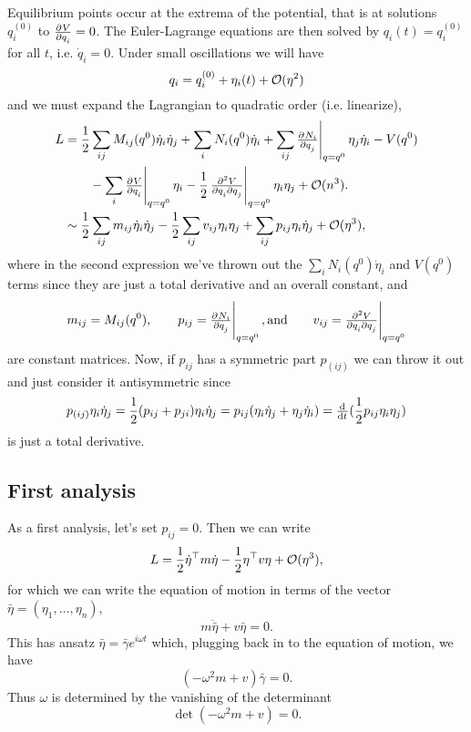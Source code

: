 Equilibrium points occur at the extrema of the potential, that is at solutions $q_i^{(0)}$ to $\pd{V}{q_i} = 0$. The Euler-Lagrange equations are then solved by $q_i(t) = q_i^{(0)}$ for all $t$, i.e. $\dot{q}_i = 0$. Under small oscillations we will have
\begin{equation}
q_i = q_i^{(0)} + \eta_i(t) + \mathcal{O}(\eta^2)
\end{equation}
and we must expand the Lagrangian to quadratic order (i.e. linearize),
\begin{align}
L &= \frac{1}{2} \sum_{ij} M_{ij} (q^{0}) \dot{\eta}_i \dot{\eta}_j + \sum_i N_i (q^{0}) \dot{\eta}_i + \sum_{ij} \eval{\pd{N_i}{q_j}}_{q=q^0} \eta_j \dot{\eta}_i - V(q^0) \\
	& \qquad - \sum_i \eval{\pd{V}{q_i}}_{q = q^0} \eta_i - \frac{1}{2} \eval{\md{V}{2}{q_i}{}{q_j}{}}_{q = q^0} \eta_i \eta_j + \bigo(n^3). \\
	&\sim \frac{1}{2} \sum_{ij} m_{ij} \dot \eta_i \dot \eta_j - \frac{1}{2} \sum_{ij} v_{ij} \eta_i \eta_j + \sum_{ij} p_{ij} \eta_i \dot \eta_j + \bigo(\eta^3),
\end{align}
where in the second expression we've thrown out the $\sum_i N_i (q^0) \dot{\eta}_i$ and $V(q^0)$ terms since they are just a total derivative and an overall constant, and 
\begin{equation}
m_{ij} = M_{ij}(q^0), \qquad p_{ij} = \eval{\pd{N_i}{q_j}}_{q = q^0}, \text{and} \qquad v_{ij} = \eval{\md{V}{2}{q_i}{}{q_j}{}}_{q = q^0}
\end{equation}
are constant matrices. Now, if $p_{ij}$ has a symmetric part $p_{(ij)}$ we can throw it out and just consider it antisymmetric since
\begin{equation}
p_{(ij)} \eta_i \dot{\eta}_j = \frac{1}{2} (p_{ij} + p_{ji}) \eta_i \dot{\eta}_j = p_{ij} (\eta_i \dot{\eta}_j + \eta_j \dot{\eta}_i) = \od{}{t} (\frac{1}{2} p_{ij} \eta_i \eta_j)
\end{equation}
is just a total derivative. 

\subsection{First analysis}

As a first analysis, let's set $p_{ij} = 0$. Then we can write
\begin{equation}
L = \frac{1}{2} \dot{\eta}^\top m \dot{\eta} - \frac{1}{2} \eta^\top v \eta + \mathcal{O}(\eta^3),
\end{equation}
for which we can write the equation of motion in terms of the vector $\bar{\eta} = (\eta_1, \dots, \eta_n)$,
\begin{equation}
m \ddot{\bar{\eta}} + v \bar{\eta} = 0.
\end{equation}
This has ansatz $\bar{\eta} = \bar{\gamma} e^{i \omega t}$ which, plugging back in to the equation of motion, we have
\begin{equation}
(-\omega^2 m + v) \bar{\gamma} = 0.
\end{equation}
Thus $\omega$ is determined by the vanishing of the determinant
\begin{equation}
\det (-\omega^2 m + v) = 0.
\end{equation}

